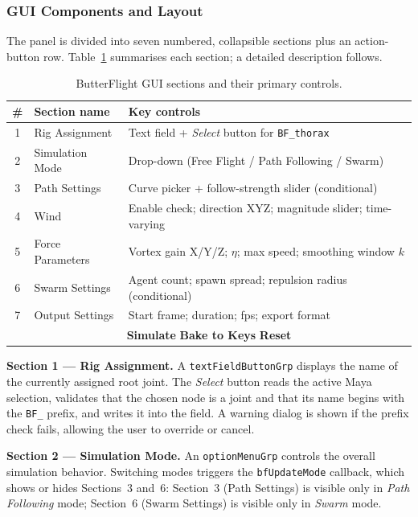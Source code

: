 \documentclass[12pt]{article}
\begin{document}
\subsubsection{GUI Components and Layout}

The panel is divided into seven numbered, collapsible sections plus an action-button
row. Table~\ref{tab:gui} summarises each section; a detailed description follows.

\begin{table}[H]
\centering
\small
\begin{tabular}{|c|l|l|}
\hline
\textbf{\#} & \textbf{Section name} & \textbf{Key controls} \\
\hline
1 & Rig Assignment      & Text field + \textit{Select} button for \texttt{BF\_thorax} \\
2 & Simulation Mode     & Drop-down (Free Flight / Path Following / Swarm) \\
3 & Path Settings       & Curve picker + follow-strength slider {\small(conditional)} \\
4 & Wind                & Enable check; direction XYZ; magnitude slider; time-varying \\
5 & Force Parameters    & Vortex gain X/Y/Z; $\eta$; max speed; smoothing window $k$ \\
6 & Swarm Settings      & Agent count; spawn spread; repulsion radius {\small(conditional)} \\
7 & Output Settings     & Start frame; duration; fps; export format \\
\hline
\multicolumn{3}{|c|}{\textbf{Simulate} \quad \textbf{Bake to Keys} \quad \textbf{Reset}} \\
\hline
\end{tabular}
\caption{ButterFlight GUI sections and their primary controls.}
\label{tab:gui}
\end{table}

\textbf{Section 1 --- Rig Assignment.}
A \texttt{textFieldButtonGrp} displays the name of the currently assigned root joint.
The \textit{Select} button reads the active Maya selection, validates that the chosen
node is a joint and that its name begins with the \texttt{BF\_} prefix, and writes it
into the field. A warning dialog is shown if the prefix check fails, allowing the user
to override or cancel.

\textbf{Section 2 --- Simulation Mode.}
An \texttt{optionMenuGrp} controls the overall simulation behavior. Switching modes
triggers the \texttt{bfUpdateMode} callback, which shows or hides Sections~3 and~6:
Section~3 (Path Settings) is visible only in \textit{Path Following} mode; Section~6
(Swarm Settings) is visible only in \textit{Swarm} mode.
\end{document}
